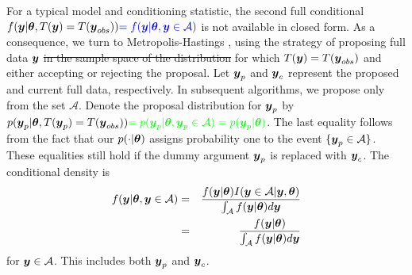\documentclass[11pt]{article}
\def\bth{\mbox{\boldmath $\theta$}}
\def\bbeta{\mbox{\boldmath $\beta$}}
\newcommand{\by}{\mbox{\boldmath $y$}}
\newcommand{\mc}{\mathcal}
\newcommand{\blue}[1]{{\color{blue}#1}}
\newcommand{\green}[1]{{\color{green}#1}}
\begin{document}
For a typical model and conditioning statistic, the second full conditional $f(\by|\bth, T(\by)=T(\by_{obs}))\blue{ =f(\by|\bth, \by\in\mc A)}$ is not available in closed form.  
As a consequence, we turn to Metropolis-Hastings \citep{hastings1970},
using the strategy of proposing full data $\by$ \green{\sout{in the sample
space of the distribution} for which $T(\by) = T(\by_{obs})$} and either accepting or rejecting the
proposal. Let $\by_p$ and  $\by_c$ represent the proposed and current
full data, respectively.  \green{In subsequent algorithms, we propose only from the set $\mathcal{A}$}. Denote the proposal distribution for $\by_{p}$ by $p(\by_p|\bth,T(\by_p) = T(\by_{obs})) \green{ = p(\by_p|\bth,\by_p \in \mathcal{A}) = p(\by_p | \bth)}$.  
\green{The last equality follows from the fact that our $p(\cdot | \bth)$ assigns probability one to the event $\{ \by_p \in \mathcal{A} \}$.  These equalities still hold if the dummy argument $\by_p$ is replaced with $\by_c$.  The conditional density is
\begin{eqnarray*}
f(\by | \bth, \by \in \mathcal{A}) & = & \frac{f(\by | \bth) I(\by \in \mathcal{A} | \by, \bth)}{\int_\mathcal{A} f(\by | \bth) d\by} \\
     & = & \frac{f(\by | \bth)}{\int_\mathcal{A} f(\by | \bth) d\by} 
\end{eqnarray*}
for $\by \in \mathcal{A}$.  This includes both $\by_p$ and $\by_c$.  
}
\end{document}
